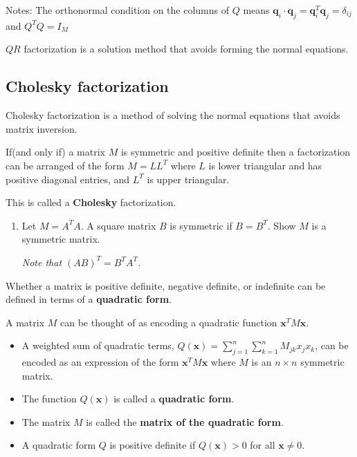\documentclass[12pt,letterpaper,noanswers]{exam}
\begin{document}
Notes: The orthonormal condition on the columns of $Q$ means $\mathbf{q}_i\cdot \mathbf{q}_j = \mathbf{q}_i^T\mathbf{q}_j = \delta_{ij}$ and $Q^TQ = I_M$


\begin{tcolorbox}
    $QR$ factorization is a solution method that avoids forming the normal equations.
\end{tcolorbox}

\subsection{Cholesky factorization}

Cholesky factorization is a method of solving the normal equations that avoids matrix inversion.

If(and only if) a matrix $M$ is symmetric and positive definite then a factorization can be arranged of the form $M = LL^T$ where $L$ is lower triangular and has positive diagonal entries, and $L^T$ is upper triangular.

This is called a \textbf{Cholesky} factorization.

\begin{enumerate}[resume]
\item Let $M = A^TA$.  A square matrix $B$ is symmetric if $B = B^T$.  Show $M$ is a symmetric matrix.

\emph{Note that $(AB)^T = B^TA^T$.}

\end{enumerate}

Whether a matrix is positive definite, negative definite, or indefinite can be defined in terms of a \textbf{quadratic form}.

A matrix $M$ can be thought of as encoding a quadratic function $\mathbf{x}^T M \mathbf{x}$.

\begin{tcolorbox}
\begin{itemize}
\itemsep0pt
    \item A weighted sum of quadratic terms, $Q(\mathbf{x}) = \sum\limits_{j=1}^n\sum\limits_{k=1}^n M_{jk}x_jx_k$, can be encoded as an expression of the form $\mathbf{x}^TM\mathbf{x}$ where $M$ is an $n\times n $ symmetric matrix.
    \item The function $Q(\mathbf{x})$ is called a \textbf{quadratic form}.
    \item 
The matrix $M$ is called the \textbf{matrix of the quadratic form}.
\item A quadratic form $Q$ is positive definite if $Q(\mathbf{x})>0$ for all $\mathbf{x}\neq 0$.
\end{itemize}
\end{tcolorbox}
\end{document}
